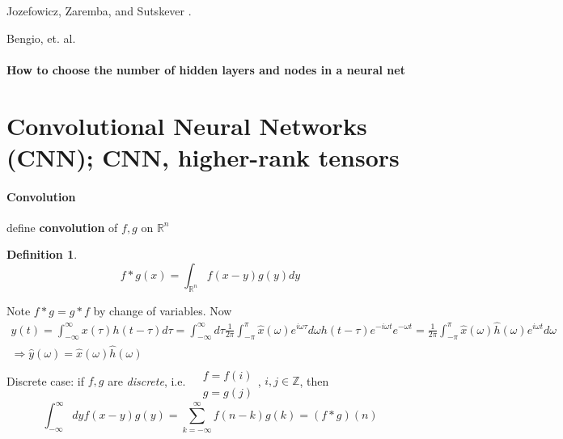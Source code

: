 \documentclass[10pt]{amsart}
\newtheorem{definition}{Definition}
\begin{document}
\begin{multicols*}{2}
Jozefowicz, Zaremba, and Sutskever \cite{JZS2015}.  

Bengio, et. al. \cite{GBC2016}



\subsection{How to choose the number of hidden layers and nodes in a neural net}


\part{Convolutional Neural Networks (CNN); CNN, higher-rank tensors}



\subsection*{Convolution}
define \textbf{convolution} of $f,g$ on $\mathbb{R}^n$
\begin{definition}
	\begin{equation}  f* g(x) = \int_{ \mathbb{R}^n } f(x-y)g(y)dy \end{equation}
\end{definition}
Note $f*g = g*f$ by change of variables.  
Now
\[
\begin{gathered}
y(t) = \int_{-\infty}^{\infty}x(\tau)h(t-\tau)d\tau = \int_{-\infty}^{\infty} d\tau \frac{1}{2\pi} \int_{-\pi}^{\pi} \widehat{x}(\omega) e^{i\omega \tau} d\omega h(t-\tau) e^{-i \omega t} e^{-\omega t} = \frac{1}{2\pi} \int_{-\pi}^{\pi} \widehat{x}(\omega) \widehat{h}(\omega) e^{i\omega t} d\omega \\ 
\Longrightarrow \widehat{y}(\omega) = \widehat{x}(\omega) \widehat{h}(\omega)
\end{gathered}
\]
Discrete case: if $f,g$ are \emph{discrete}, i.e. $\begin{aligned} & \quad \\
& f = f(i) \\
& g = g(j) \end{aligned}$, $i,j \in \mathbb{Z}$, then
\[
\int_{-\infty}^{\infty} dy f(x-y)g(y) = \sum_{k=-\infty}^{\infty} f(n-k) g(k) = (f*g)(n)
\]

\end{multicols*}
\end{document}
